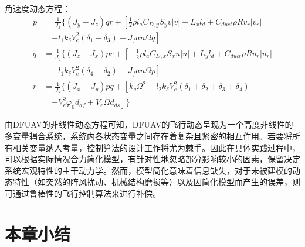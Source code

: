 角速度动态方程：
\begin{equation}
    \begin{aligned}
        \dot{p}  &=\frac{1}{J_x}\Bigg\{ (J_y-J_z)qr+
        \left[\frac{1}{2}\rho{l_a} C_{D,y}S_yv|v|+L_xl_d+C_{duct}\rho{R}
        v_r|v_r| \right.\\
        & \quad\left.- l_1k_\delta V_e^2(\delta_1 - \delta_3)-J_fan\Omega{q}\right] \\
        \dot{q}  &=\frac{1}{J_y}\Bigg\{ (J_z-J_x)pr+
        \left[-\frac{1}{2}\rho{l_a} C_{D,x}S_xu|u|+L_yl_d+C_{duct}\rho{R}
        u_r|u_r| \right.\\
        & \quad\left.+ l_1k_\delta V_e^2(\delta_4 - \delta_2)+J_fan\Omega{p}\right] \\
        \dot{r}  &=\frac{1}{J_z}\Bigg\{ (J_x-J_y)pq+
        \left[k_q\Omega^2 +l_2k_\delta V_e^2(\delta_1 + \delta_2 + \delta_3 + \delta_4)\right.\\
        & \quad\left.+V_e^2\varphi_0d_{af}+V_e\Omega{d_{ds}}\right]
        \Bigg\}
    \end{aligned}
    \label{eq_43}
\end{equation}

由DFUAV的非线性动态方程可知，DFUAV的飞行动态呈现为一个高度非线性的多变量耦合系统，系统内各状态变量之间存在着复杂且紧密的相互作用。若要将所有相关变量纳入考量，控制算法的设计工作将尤为棘手。因此在具体实践过程中，可以根据实际情况合力简化模型，有针对性地忽略部分影响较小的因素，保留决定系统宏观特性的主干动力学。然而，模型简化意味着信息缺失，对于未被建模的动态特性（如突然的阵风扰动、机械结构磨损等）以及因简化模型而产生的误差，则可通过鲁棒性的飞行控制算法来进行补偿。

\section{本章小结}











